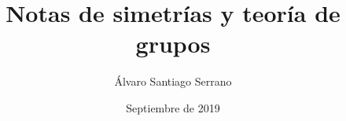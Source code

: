 

\title{Notas de simetrías y teoría de grupos}
\author{Álvaro Santiago Serrano }
\date{Septiembre de 2019}




\maketitle










